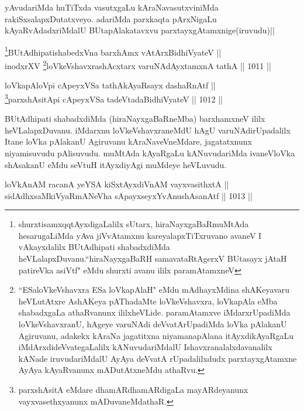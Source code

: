 \begin{artha}
yAvudariMda huTiTxda vasutxgaLu kAraNavasutxviniMda rakiSxsalapxDutatxveyo. adariMda parxkaqta pArxNigaLu kAyaRvAdadxriMdalU BUtapAlakatavxvu parxtayxgAtamxnige(iruvudu)||
\end{artha}

\begin{shl}
\footnote{shurxtisamxqqtAyxdigaLalilx sUtarx, hiraNayxgaBaRmuMtAda hesarugaLiMda yAva jiVvAtamxnu kareyalapxTiTxruvano avaneV I vAkayxdalilx BUtAdhipati shabadxdiMda heVLalapxDuvanu.``hiraNayxgaBaRH samavataRtAgerxV BUtasayx jAtaH patireVka asiVtf" eMdu shurxti avanu ililx paramAtamxneV}BUtAdhipatishabedxVna barxhAmx vA\s tArxBidhiVyateV || \\
inodxrXV \footnote{``ESaloVkeVshavxra ESa loVkapAlaH" eMdu mAdhayxMdina shAKeyavaru heVLutAtxre AshAKeya pAThadaMte loVkeVshavxra, loVkapAla eMba shabadxgaLa athaRvanunx ililxheVLide. paramAtamxve iMdarxrUpadiMda loVkeVshavxranU, hAgeye varuNAdi deVvatArUpadiMda loVka pAlakanU Agiruvanu, adakekx kAraNa jagatitxna niyamanapAlana itAyxdikAyaRgaLu iMdArxdideVvategaLalilx kANuvudariMdalU Ishavxranalalxdavanalilx kANade iruvudariMdalU AyAya deVvatA rUpadalilxdudx parxtayxgAtamxne AyAya kAyaRvanunx mADutAtxneMdu athaRvu.}loVkeVshavxrashAcxtarx varuNAdAyxtamxnA tathA \hfill || 1011 ||  
\end{shl}
				
\begin{shl}
loVkapAloV\s pi cApeyxVSa tathAkAyaRsayx dashaRnAtf || \\
\footnote{parxshAsitA eMdare dhamARdhamARdigaLa mayARdeyanunx vayxvasethxyanunx mADuvaneMdathaR.}parxshAsitA\s pi cApeyxVSa tadeVtadaBidhiVyateV \hfill || 1012 ||  
\end{shl}


\begin{artha}
BUtAdhipati shabadxdiMda (hiraNayxgaBaRneMba) barxhamxneV ililx heVLalapxDuvanu. iMdarxnu loVkeVshavxraneMdU hAgU varuNAdirUpadalilx Itane loVka pAlakanU Agiruvanu kAraNaveVneMdare, jagatatxnunx niyamisuvudu pAlisuvudu. muMtAda kAyaRgaLu kANuvudariMda ivaneVloVka shAsakanU eMdu seVtuH itAyxdiyAgi muMdeye heVLuvudu.
\end{artha}


\begin{shl}
loVkAnAM racanA yeYSA kiSxtAyxdiVnAM vayxvasithxtA || \\
sidAdhx\s saMkiVyaRmANeVha sA\s payxseyxYvAnushAsanAtf \hfill || 1013 ||  
\end{shl}

